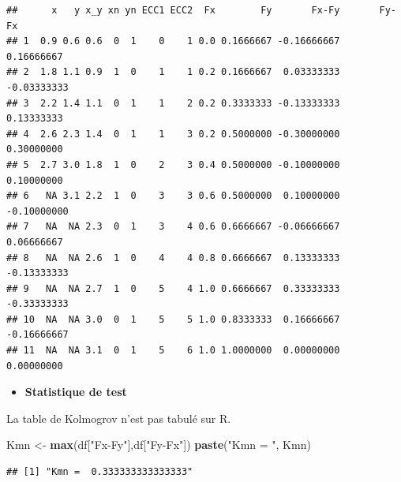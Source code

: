 \documentclass[
  12pt,
]{article}
\newenvironment{Shaded}{\begin{snugshade}}{\end{snugshade}}
\newcommand{\FunctionTok}[1]{\textcolor[rgb]{0.13,0.29,0.53}{\textbf{#1}}}
\newcommand{\NormalTok}[1]{#1}
\newcommand{\OtherTok}[1]{\textcolor[rgb]{0.56,0.35,0.01}{#1}}
\newcommand{\SpecialCharTok}[1]{\textcolor[rgb]{0.81,0.36,0.00}{\textbf{#1}}}
\newcommand{\StringTok}[1]{\textcolor[rgb]{0.31,0.60,0.02}{#1}}
\providecommand{\tightlist}{%
  \setlength{\itemsep}{0pt}\setlength{\parskip}{0pt}}
\begin{document}
\begin{Shaded}
\end{Shaded}

\begin{verbatim}
##      x   y x_y xn yn ECC1 ECC2  Fx        Fy       Fx-Fy       Fy-Fx
## 1  0.9 0.6 0.6  0  1    0    1 0.0 0.1666667 -0.16666667  0.16666667
## 2  1.8 1.1 0.9  1  0    1    1 0.2 0.1666667  0.03333333 -0.03333333
## 3  2.2 1.4 1.1  0  1    1    2 0.2 0.3333333 -0.13333333  0.13333333
## 4  2.6 2.3 1.4  0  1    1    3 0.2 0.5000000 -0.30000000  0.30000000
## 5  2.7 3.0 1.8  1  0    2    3 0.4 0.5000000 -0.10000000  0.10000000
## 6   NA 3.1 2.2  1  0    3    3 0.6 0.5000000  0.10000000 -0.10000000
## 7   NA  NA 2.3  0  1    3    4 0.6 0.6666667 -0.06666667  0.06666667
## 8   NA  NA 2.6  1  0    4    4 0.8 0.6666667  0.13333333 -0.13333333
## 9   NA  NA 2.7  1  0    5    4 1.0 0.6666667  0.33333333 -0.33333333
## 10  NA  NA 3.0  0  1    5    5 1.0 0.8333333  0.16666667 -0.16666667
## 11  NA  NA 3.1  0  1    5    6 1.0 1.0000000  0.00000000  0.00000000
\end{verbatim}

\begin{itemize}
\tightlist
\item
  \textbf{Statistique de test}
\end{itemize}

La table de Kolmogrov n'est pas tabulé sur R.

\begin{Shaded}
\begin{Highlighting}[]
\NormalTok{Kmn }\OtherTok{\textless{}{-}} \FunctionTok{max}\NormalTok{(df[}\StringTok{"Fx{-}Fy"}\NormalTok{],df[}\StringTok{"Fy{-}Fx"}\NormalTok{])}
\FunctionTok{paste}\NormalTok{(}\StringTok{"Kmn = "}\NormalTok{, Kmn)}
\end{Highlighting}
\end{Shaded}

\begin{verbatim}
## [1] "Kmn =  0.333333333333333"
\end{verbatim}
\end{document}
